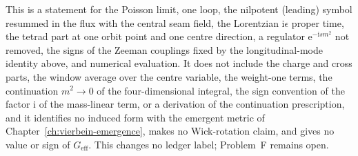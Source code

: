 This is a statement for the Poisson limit, one loop, the nilpotent (leading) symbol resummed in the flux with the central seam field, the Lorentzian \(\mathrm i\epsilon\) proper time, the tetrad part at one orbit point and one centre direction, a regulator \(\mathrm e^{-\mathrm ism^2}\) not removed, the signs of the Zeeman couplings fixed by the longitudinal-mode identity above, and numerical evaluation. It does not include the charge and cross parts, the window average over the centre variable, the weight-one terms, the continuation \(m^2\to0\) of the four-dimensional integral, the sign convention of the factor \(\mathrm i\) of the mass-linear term, or a derivation of the continuation prescription, and it identifies no induced form with the emergent metric of Chapter~\ref{ch:vierbein-emergence}, makes no Wick-rotation claim, and gives no value or sign of \(G_{\mathrm{eff}}\). This changes no ledger label; Problem~F remains open.

